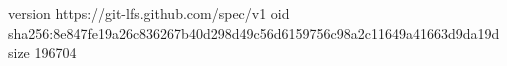 version https://git-lfs.github.com/spec/v1
oid sha256:8e847fe19a26c836267b40d298d49c56d6159756c98a2c11649a41663d9da19d
size 196704
